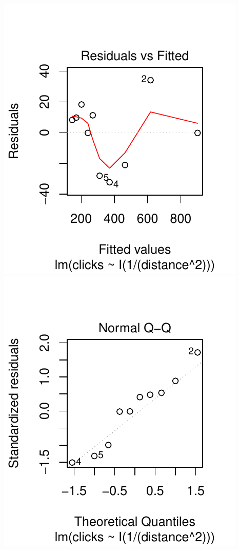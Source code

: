 \documentclass[twoside]{book}\usepackage[]{graphicx}\usepackage[]{xcolor}
\makeatletter
\def\maxwidth{ %
  \ifdim\Gin@nat@width>\linewidth
    \linewidth
  \else
    \Gin@nat@width
  \fi
}
\newenvironment{knitrout}{}{} %
\makeatother
\begin{document}
\begin{problem}
\begin{knitrout}
{\centering \includegraphics[width=\maxwidth]{figures/fig-unnamed-chunk-281-1} 
\includegraphics[width=\maxwidth]{figures/fig-unnamed-chunk-281-2} 

}
\end{knitrout}
\end{problem}
\end{document}
